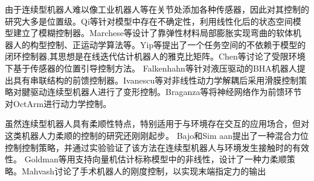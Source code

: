 由于连续型机器人难以像工业机器人等在关节处添加各种传感器，因此对其控制的研究大多是位置级。Qi等针对模型中存在不确定性，利用线性化后的状态空间模型建立了模糊控制器\cite{qi_kinematic_2016}。Marchese等设计了靠弹性材料局部膨胀实现弯曲的软体机器人的构型控制、正运动学算法等\cite{marchese_design_2016}。Yip等提出了一个任务空间的不依赖于模型的闭环控制器\cite{yip_model-less_2014},其思想是在线迭代估计机器人的雅克比矩阵。Chen等讨论了受限环境下基于传感器的位置引导控制方法\cite{chen_sensor-based_2009}。
%	  
Falkenhahn等针对液压驱动的BHA机器人提出具有串联结构的前馈控制器\cite{falkenhahn_dynamic_2017}。Ivanescu等对非线性动力学解耦后采用滑膜控制策略对腱驱动连续型机器人进行了变形控制\cite{ivanescu_decoupled_2015}。Braganza等将神经网络作为前馈环节对OctArm进行动力学控制\cite{braganza_neural_2007}。
 
虽然连续型机器人具有柔顺性特点，特别适用于与环境存在交互的应用场合，但对这类机器人力柔顺的控制的研究还刚刚起步。
Bajo和Sim
aan提出了一种混合力位控制控制策略，并通过实验验证了该方法在连续型机器人与环境发生接触时的有效性\cite{bajo_hybrid_2016}。
Goldman等用支持向量机估计标称模型中的非线性，设计了一种力柔顺策略\cite{goldman_compliant_2014}。Mahvash讨论了手术机器人的刚度控制，以实现末端指定力的输出\cite{mahvash_stiffness_2011}
